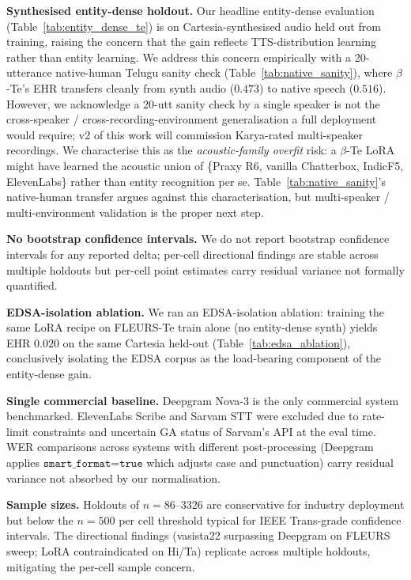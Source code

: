 \documentclass[conference,a4paper]{IEEEtran}
\begin{document}
\textbf{Synthesised entity-dense holdout.} Our headline entity-dense evaluation (Table~\ref{tab:entity_dense_te}) is on Cartesia-synthesised audio held out from training, raising the concern that the gain reflects TTS-distribution learning rather than entity learning. We address this concern empirically with a 20-utterance native-human Telugu sanity check (Table~\ref{tab:native_sanity}), where $\beta$-Te's EHR transfers cleanly from synth audio ($0.473$) to native speech ($0.516$). However, we acknowledge a 20-utt sanity check by a single speaker is not the cross-speaker / cross-recording-environment generalisation a full deployment would require; v2 of this work will commission Karya-rated multi-speaker recordings. We characterise this as the \emph{acoustic-family overfit} risk: a $\beta$-Te LoRA might have learned the acoustic union of \{Praxy R6, vanilla Chatterbox, IndicF5, ElevenLabs\} rather than entity recognition per se. Table~\ref{tab:native_sanity}'s native-human transfer argues against this characterisation, but multi-speaker / multi-environment validation is the proper next step.

\textbf{No bootstrap confidence intervals.} We do not report bootstrap confidence intervals for any reported delta; per-cell directional findings are stable across multiple holdouts but per-cell point estimates carry residual variance not formally quantified.

\textbf{EDSA-isolation ablation.} We ran an EDSA-isolation ablation: training the same LoRA recipe on FLEURS-Te train alone (no entity-dense synth) yields EHR $0.020$ on the same Cartesia held-out (Table~\ref{tab:edsa_ablation}), conclusively isolating the EDSA corpus as the load-bearing component of the entity-dense gain.

\textbf{Single commercial baseline.} Deepgram Nova-3 is the only commercial system benchmarked. ElevenLabs Scribe and Sarvam STT were excluded due to rate-limit constraints and uncertain GA status of Sarvam's API at the eval time. WER comparisons across systems with different post-processing (Deepgram applies $\texttt{smart\_format=true}$ which adjusts case and punctuation) carry residual variance not absorbed by our normalisation.

\textbf{Sample sizes.} Holdouts of $n=86$--$3326$ are conservative for industry deployment but below the $n=500$ per cell threshold typical for IEEE Trans-grade confidence intervals. The directional findings (vasista22 surpassing Deepgram on FLEURS sweep; LoRA contraindicated on Hi/Ta) replicate across multiple holdouts, mitigating the per-cell sample concern.
\end{document}
